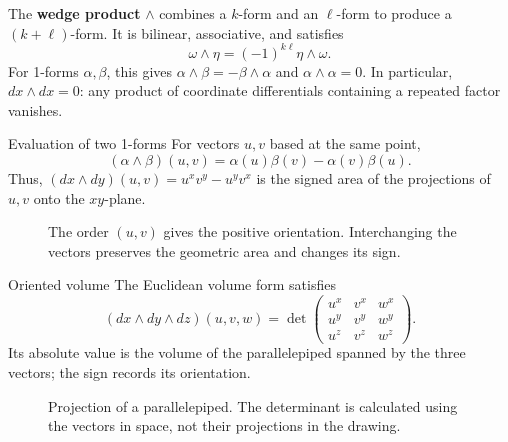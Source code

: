 \documentclass[11pt,letterpaper]{article}
\newcommand{\manualsection}[1]{%
  \Needspace{16\baselineskip}%
  \vspace{0.35cm}
  \par\noindent{\Large\bfseries\color{blackmain} #1}\par\nobreak
  \noindent{\color{orangeacc}\rule{\linewidth}{1.4pt}}\par\nobreak
  \vspace{0.15cm}
}
\newcommand{\term}[1]{\textbf{\color{orangeacc}#1}}
\begin{document}
\newpage
\manualsection{2. Wedge product and orientation}
The \term{wedge product} $\wedge$ combines a $k$-form and an $\ell$-form to produce a $(k+\ell)$-form. It is bilinear, associative, and satisfies
\[
\omega\wedge\eta=(-1)^{k\ell}\eta\wedge\omega.
\]
For 1-forms $\alpha,\beta$, this gives $\alpha\wedge\beta=-\beta\wedge\alpha$ and $\alpha\wedge\alpha=0$. In particular, $dx\wedge dx=0$: any product of coordinate differentials containing a repeated factor vanishes.
\begin{infobox}[orangeacc]{Evaluation of two 1-forms}
For vectors $u,v$ based at the same point,
\[
(\alpha\wedge\beta)(u,v)=\alpha(u)\beta(v)-\alpha(v)\beta(u).
\]
Thus, $(dx\wedge dy)(u,v)=u^xv^y-u^yv^x$ is the signed area of the projections of $u,v$ onto the $xy$-plane.
\end{infobox}
\begin{figure}[htbp]
\centering
{}
\caption{The order $(u,v)$ gives the positive orientation. Interchanging the vectors preserves the geometric area and changes its sign.}
\end{figure}
\FloatBarrier
\begin{theorembox}{Oriented volume}
The Euclidean volume form satisfies
\[
(dx\wedge dy\wedge dz)(u,v,w)
=\det\begin{pmatrix}u^x&v^x&w^x\\u^y&v^y&w^y\\u^z&v^z&w^z\end{pmatrix}.
\]
Its absolute value is the volume of the parallelepiped spanned by the three vectors; the sign records its orientation.
\end{theorembox}
\begin{figure}[htbp]
\centering
{}
\caption{Projection of a parallelepiped. The determinant is calculated using the vectors in space, not their projections in the drawing.}
\end{figure}
\FloatBarrier
\end{document}
